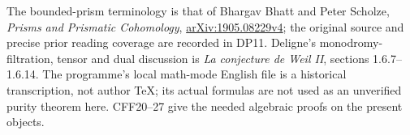 \documentclass[11pt]{article}
\begin{document}
The bounded-prism terminology is that of Bhargav Bhatt
and Peter Scholze, \emph{Prisms and Prismatic Cohomology},
\href{https://arxiv.org/abs/1905.08229}{arXiv:1905.08229v4};
the original source and precise prior reading coverage are
recorded in DP11. Deligne's monodromy-filtration, tensor
and dual discussion is \emph{La conjecture de Weil II},
sections 1.6.7--1.6.14. The programme's local math-mode
English file is a historical transcription, not author
TeX; its actual formulas are not used as an unverified
purity theorem here. CFF20--27 give the needed algebraic
proofs on the present objects.
\appendix

\end{document}
